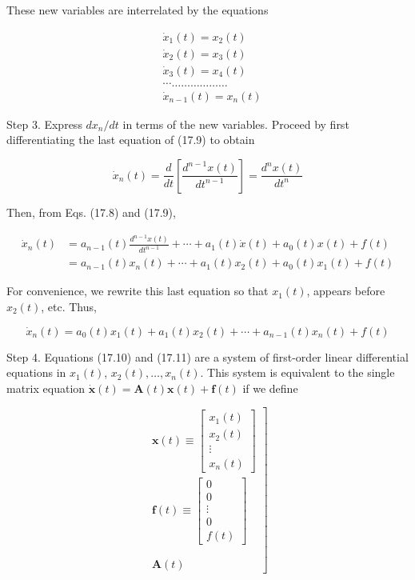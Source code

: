 \documentclass[10pt]{article}
\begin{document}
These new variables are interrelated by the equations


\begin{align*}
& \dot{x}_{1}(t)=x_{2}(t) \\
& \dot{x}_{2}(t)=x_{3}(t) \\
& \dot{x}_{3}(t)=x_{4}(t)  \tag{17.10}\\
& \cdots \ldots \ldots \ldots \ldots \ldots \ldots \\
& \dot{x}_{n-1}(t)=x_{n}(t)
\end{align*}


Step 3. Express $d x_{n} / d t$ in terms of the new variables. Proceed by first differentiating the last equation of (17.9) to obtain

$$
\dot{x}_{n}(t)=\frac{d}{d t}\left[\frac{d^{n-1} x(t)}{d t^{n-1}}\right]=\frac{d^{n} x(t)}{d t^{n}}
$$

Then, from Eqs. (17.8) and (17.9),

$$
\begin{aligned}
\dot{x}_{n}(t) & =a_{n-1}(t) \frac{d^{n-1} x(t)}{d t^{n-1}}+\cdots+a_{1}(t) \dot{x}(t)+a_{0}(t) x(t)+f(t) \\
& =a_{n-1}(t) x_{n}(t)+\cdots+a_{1}(t) x_{2}(t)+a_{0}(t) x_{1}(t)+f(t)
\end{aligned}
$$

For convenience, we rewrite this last equation so that $x_{1}(t)$, appears before $x_{2}(t)$, etc. Thus,


\begin{equation*}
\dot{x}_{n}(t)=a_{0}(t) x_{1}(t)+a_{1}(t) x_{2}(t)+\cdots+a_{n-1}(t) x_{n}(t)+f(t) \tag{17.11}
\end{equation*}


Step 4. Equations (17.10) and (17.11) are a system of first-order linear differential equations in $x_{1}(t)$, $x_{2}(t), \ldots, x_{n}(t)$. This system is equivalent to the single matrix equation $\dot{\mathbf{x}}(t)=\mathbf{A}(t) \mathbf{x}(t)+\mathbf{f}(t)$ if we define

\[
\left.\begin{array}{c}
\mathbf{x}(t) \equiv\left[\begin{array}{c}
x_{1}(t) \\
x_{2}(t) \\
\vdots \\
x_{n}(t)
\end{array}\right] \\
\mathbf{f}(t) \equiv\left[\begin{array}{c}
0 \\
0 \\
\vdots \\
0 \\
f(t)
\end{array}\right] \\
 \tag{17.14}\\
\\
\mathbf{A}(t)
\end{array}\right]
\]
\end{document}
